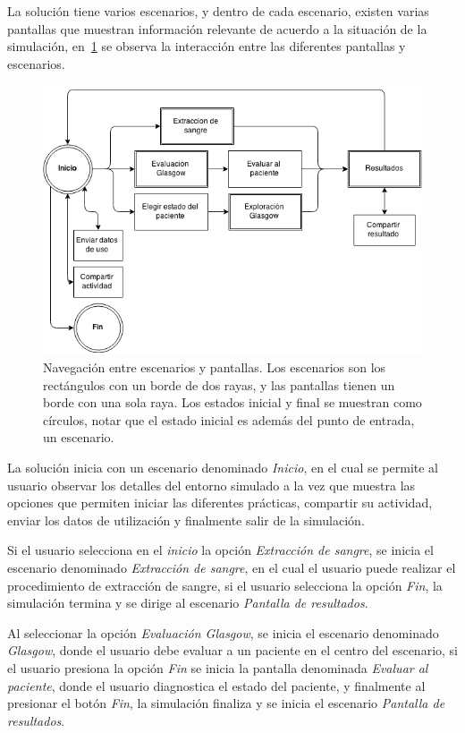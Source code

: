 La solución tiene varios escenarios, y dentro de cada escenario, existen varias
pantallas que muestran información relevante de acuerdo a la situación de la
simulación, en~\ref{fig:grafo_estados} se observa la interacción entre las
diferentes pantallas y escenarios.

\begin{figure}[H] 
\centering 
\includegraphics[scale=0.5]{propuesta/grafo_escenas.png}
\caption{Navegación entre escenarios y pantallas. Los escenarios son los
    rectángulos con un borde de dos rayas, y las pantallas tienen un borde con una
    sola raya. Los estados inicial y final se muestran como círculos, notar que
    el estado inicial es además del punto de entrada, un escenario.}
\label{fig:grafo_estados}
\end{figure}

La solución inicia con un escenario denominado \emph{Inicio}, en el cual se
permite al usuario observar los detalles del entorno simulado a la vez que
muestra las opciones que permiten iniciar las diferentes prácticas, compartir
su actividad, enviar los datos de utilización y finalmente salir de la
simulación.

Si el usuario selecciona en el \emph{inicio} la opción \emph{Extracción de
    sangre}, se inicia el escenario denominado \emph{Extracción de sangre}, en
el cual el usuario puede realizar el procedimiento de extracción de sangre, si
el usuario selecciona la opción \emph{Fin}, la simulación termina y se dirige 
al escenario \emph{Pantalla de resultados}.

Al seleccionar la opción \emph{Evaluación Glasgow}, se inicia el escenario
denominado \emph{Glasgow}, donde el usuario debe evaluar a un paciente en el
centro del escenario, si el usuario presiona la opción \emph{Fin} se inicia la
pantalla denominada \emph{Evaluar al paciente}, donde el usuario diagnostica el
estado del paciente, y finalmente al presionar el botón \emph{Fin}, la
simulación finaliza y se inicia el escenario \emph{Pantalla de resultados}.

